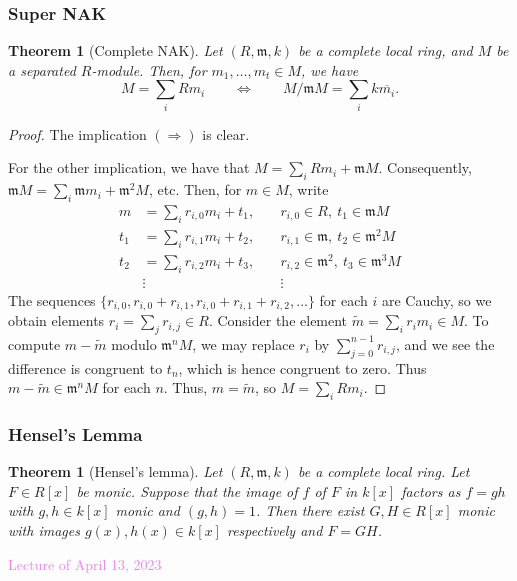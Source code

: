 \documentclass{amsart}[12pt]
\newcommand{\Apr}[1]{\textcolor{violet}{Lecture of April #1, 2023}}
\newcommand{\fm}{{\mathfrak m}}
\numberwithin{equation}{section}
\theoremstyle{plain} %
\newtheorem{thm}[equation]{Theorem}
\theoremstyle{definition}
\theoremstyle{remark}
\begin{document}
 \subsubsection{Super NAK}

\begin{thm}[Complete NAK] Let $(R,\fm,k)$ be a complete local ring, and $M$ be a separated $R$-module. Then, for $m_1,\dots,m_t\in M$, we have
	\[ M = \sum_i R m_i \qquad \Longleftrightarrow \qquad M/\fm M = \sum_i k \overline{m_i}. \]
\end{thm}
\begin{proof} 	The implication $(\Rightarrow)$ is clear. 

For the other implication, we have that $M=\sum_i R m_i + \fm M$. Consequently, $\fm M = \sum_i \fm m_i + \fm^2 M$, etc. Then, for $m\in M$, write
	\[\begin{aligned} m &= \sum_i r_{i,0} m_i + t_1, \quad &r_{i,0}\in R, \ t_1\in \fm M \\
	t_1 &= \sum_i r_{i,1} m_i + t_2, \quad &r_{i,1}\in \fm, \ t_2\in \fm^2 M\\
		t_2 &= \sum_i r_{i,2} m_i + t_3, \quad &r_{i,2}\in \fm^2, \ t_3\in \fm^3 M\\
	&\vdots &\vdots
	 \end{aligned}\]
	The sequences $\{ r_{i,0}, r_{i,0} + r_{i,1}, r_{i,0} + r_{i,1} + r_{i,2}, \dots\}$ for each $i$ are Cauchy, so we obtain elements $r_i = \sum_j r_{i,j}\in R$. Consider the element $\tilde{m}=\sum_i r_i m_i \in M$. To compute $m-\tilde{m}$ modulo $\fm^n M$, we may replace $r_i$ by $\sum_{j=0}^{n-1} r_{i,j}$, and we see the difference is congruent to $t_n$, which is hence congruent to zero. Thus $m-\tilde{m} \in \fm^n M$ for each $n$.  Thus, $m=\tilde{m}$, so $M=\sum_i R m_i$.
\end{proof}


 \subsubsection{Hensel's Lemma}
 
 \begin{thm}[Hensel's lemma]
	Let $(R,\fm,k)$ be a complete local ring. Let $F\in R[x]$ be monic. Suppose that the image of $f$ of $F$ in  $k[x]$ factors as $f =g h$ with $g,h\in k[x]$ monic and $(g,h)=1$. Then there exist $G,H\in R[x]$ monic with images $g(x),h(x) \in k[x]$ respectively and $F= GH$.
\end{thm}

\Apr{13}
\end{document}
